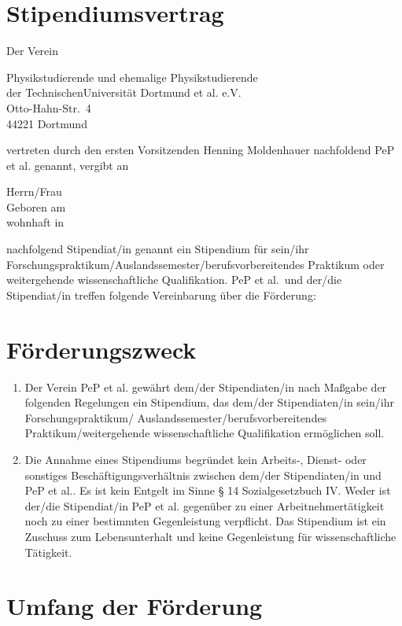 \documentclass[
  paper=a4,
  fontsize=12pt,
  DIV=16,
  parskip=full,
  headinclude=true,
]{scrartcl}
\date{02. Februar 2015}
\begin{document}
\thispagestyle{firstpage}
\section*{Stipendiumsvertrag}

Der Verein

Physikstudierende und ehemalige Physikstudierende\\
der TechnischenUniversität Dortmund et al. e.V.\\
Otto-Hahn-Str.~4\\
44221 Dortmund

vertreten durch den ersten Vorsitzenden Henning Moldenhauer nachfoldend
PeP et al. genannt, vergibt an

Herrn/Frau\\
Geboren am\\
wohnhaft in

nachfolgend Stipendiat/in genannt ein Stipendium für sein/ihr
Forschungspraktikum/Auslandssemester/berufsvorbereitendes Praktikum oder
weitergehende wissenschaftliche Qualifikation.
PeP et al.\ und der/die Stipendiat/in treffen folgende Vereinbarung über die
Förderung:

\section{Förderungszweck}

\begin{enumerate}[\qquad(1)]
	\item Der Verein PeP et al. gewährt dem/der Stipendiaten/in nach
		Maßgabe der folgenden Regelungen ein Stipendium, das
		dem/der Stipendiaten/in sein/ihr Forschungspraktikum/
		Auslandssemester/berufsvorbereitendes Praktikum/weitergehende
		wissenschaftliche Qualifikation ermöglichen soll.
	\item Die Annahme eines Stipendiums begründet kein Arbeits-, Dienst-
		oder sonstiges Beschäftigungsverhältnis zwischen dem/der
		Stipendiaten/in und PeP et al.. Es ist kein Entgelt im Sinne
		§ 14 Sozialgesetzbuch IV. Weder ist der/die Stipendiat/in
		PeP et al. gegenüber zu einer Arbeitnehmertätigkeit
		noch zu einer bestimmten Gegenleistung verpflicht.
		Das Stipendium ist ein Zuschuss zum Lebensunterhalt und
		keine Gegenleistung für wissenschaftliche Tätigkeit.
\end{enumerate}

\section{Umfang der Förderung}
\end{document}
